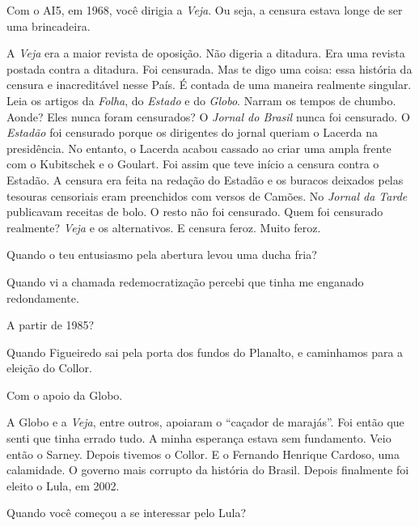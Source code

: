  Com o AI5, em 1968, você dirigia a \emph{Veja}. Ou seja, a censura
estava longe de ser uma brincadeira.

 A \emph{Veja} era a maior revista de oposição. Não digeria a
ditadura. Era uma revista postada contra a ditadura. Foi censurada. Mas
te digo uma coisa: essa história da censura e inacreditável nesse País.
É contada de uma maneira realmente singular. Leia os artigos da
\emph{Folha}, do \emph{Estado} e do \emph{Globo}. Narram os tempos de
chumbo. Aonde? Eles nunca foram censurados? O \emph{Jornal do Brasil}
nunca foi censurado. O \emph{Estadão} foi censurado porque os dirigentes
do jornal queriam o Lacerda na presidência. No entanto, o Lacerda acabou
cassado ao criar uma ampla frente com o Kubitschek e o Goulart. Foi
assim que teve início a censura contra o Estadão. A censura era feita na
redação do Estadão e os buracos deixados pelas tesouras censoriais eram
preenchidos com versos de Camões. No \emph{Jornal da Tarde} publicavam
receitas de bolo. O resto não foi censurado. Quem foi censurado
realmente? \emph{Veja} e os alternativos. E censura feroz. Muito feroz.

 Quando o teu entusiasmo pela abertura levou uma ducha fria?

 Quando vi a chamada redemocratização percebi que tinha me enganado
redondamente.

 A partir de 1985?

 Quando Figueiredo sai pela porta dos fundos do Planalto, e caminhamos
para a eleição do Collor.

 Com o apoio da Globo.

 A Globo e a \emph{Veja}, entre outros, apoiaram o ``caçador de
marajás''. Foi então que senti que tinha errado tudo. A minha esperança
estava sem fundamento. Veio então o Sarney. Depois tivemos o Collor. E o
Fernando Henrique Cardoso, uma calamidade. O governo mais corrupto da
história do Brasil. Depois finalmente foi eleito o Lula, em 2002.

 Quando você começou a se interessar pelo Lula?

